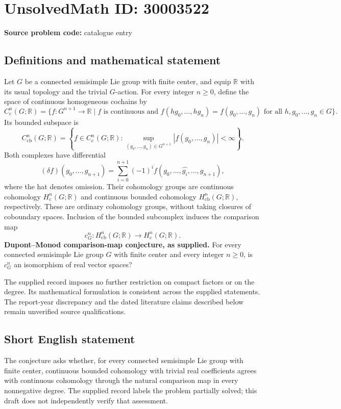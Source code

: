 \documentclass[11pt]{article}
\newcommand{\R}{\mathbb{R}}
\begin{document}
\section*{UnsolvedMath ID: 30003522}
\textbf{Source problem code:} catalogue entry
\subsection{Definitions and mathematical statement}
Let \(G\) be a connected semisimple Lie group with finite center, and equip \(\R\) with its usual topology and the trivial \(G\)-action. For every integer \(n\geq 0\), define the space of continuous homogeneous cochains by
\[
C^n_{\mathrm c}(G;\R)=\{f:G^{n+1}\to\R\mid f\text{ is continuous and }f(hg_0,\ldots,hg_n)=f(g_0,\ldots,g_n)\text{ for all }h,g_0,\ldots,g_n\in G\}.
\]
Its bounded subspace is
\[
C^n_{\mathrm{cb}}(G;\R)=\left\{f\in C^n_{\mathrm c}(G;\R):\sup_{(g_0,\ldots,g_n)\in G^{n+1}}|f(g_0,\ldots,g_n)|<\infty\right\}.
\]
Both complexes have differential
\[
(\delta f)(g_0,\ldots,g_{n+1})=\sum_{i=0}^{n+1}(-1)^i f(g_0,\ldots,\widehat{g_i},\ldots,g_{n+1}),
\]
where the hat denotes omission. Their cohomology groups are continuous cohomology \(H^n_{\mathrm c}(G;\R)\) and continuous bounded cohomology \(H^n_{\mathrm{cb}}(G;\R)\), respectively. These are ordinary cohomology groups, without taking closures of coboundary spaces. Inclusion of the bounded subcomplex induces the comparison map
\[
c_G^n:H^n_{\mathrm{cb}}(G;\R)\longrightarrow H^n_{\mathrm c}(G;\R).
\]
\textbf{Dupont--Monod comparison-map conjecture, as supplied.} For every connected semisimple Lie group \(G\) with finite center and every integer \(n\geq 0\), is \(c_G^n\) an isomorphism of real vector spaces?

The supplied record imposes no further restriction on compact factors or on the degree. Its mathematical formulation is consistent across the supplied statements. The report-year discrepancy and the dated literature claims described below remain unverified source qualifications.
\subsection{Short English statement}
The conjecture asks whether, for every connected semisimple Lie group with finite center, continuous bounded cohomology with trivial real coefficients agrees with continuous cohomology through the natural comparison map in every nonnegative degree. The supplied record labels the problem partially solved; this draft does not independently verify that assessment.
\end{document}
